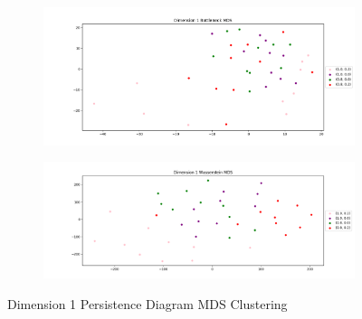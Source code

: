 \documentclass[12pt, fullpage,letterpaper]{article}
\theoremstyle{definition}
\begin{document}
	\begin{figure}[ht!]
		\centering
		\begin{subfigure}
			\centering
			\includegraphics[scale = .5]{dim1mdsripserbott.png}
		\end{subfigure}
		\begin{subfigure}
			\centering
			\includegraphics[scale = .5]{dim1mdsripserwasser.png}
		\end{subfigure}
		\caption{Dimension 1 Persistence Diagram MDS Clustering}
	\end{figure}
\end{document}
